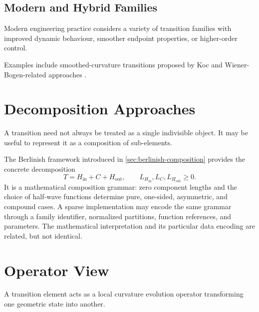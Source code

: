 \subsection{Modern and Hybrid Families}

Modern engineering practice considers a variety of transition families
with improved dynamic behaviour, smoother endpoint properties, or
higher-order control.

Examples include smoothed-curvature transitions proposed by Koc
\cite{Koc2017SmoothedEnds,Koc2019SmoothedTransition,Koc2019Operational}
and Wiener-Bogen-related approaches
\cite{Wojtczak2017WienerBogen}.


\section{Decomposition Approaches}

A transition need not always be treated as a single indivisible object.
It may be useful to represent it as a composition of sub-elements.

The Berlinish framework introduced in
\cref{sec:berlinish-composition} provides the concrete decomposition
\[
T=H_{\mathrm{in}}+C+H_{\mathrm{out}},
\qquad
L_{H_{\mathrm{in}}},L_C,L_{H_{\mathrm{out}}}\geq 0.
\]
It is a mathematical composition grammar: zero component lengths and the
choice of half-wave functions determine pure, one-sided, asymmetric, and
compound cases. A sparse implementation may encode the same grammar through a
family identifier, normalized partitions, function references, and parameters.
The mathematical interpretation and its particular data encoding are related,
but not identical.

\section{Operator View}

\begin{principle}
A transition element acts as a local curvature evolution operator
transforming one geometric state into another.
\end{principle}

